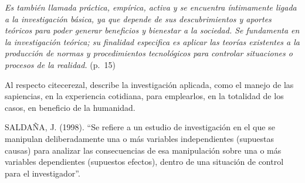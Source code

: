 \documentclass[12pt,a4paper]{article}
\begin{document}
\begin{displayquote}
\emph{Es también llamada práctica, empírica, activa y se encuentra íntimamente ligada a la investigación básica, ya que depende de sus descubrimientos y aportes teóricos para poder generar beneficios y bienestar a la sociedad. Se fundamenta en la investigación teórica; su finalidad especifica es aplicar las teorías existentes a la producción de normas y procedimientos tecnológicos para controlar situaciones  o procesos de la realidad.} (p.~15)
\end{displayquote}

Al respecto cite{cerezal}, describe la investigación aplicada, como el manejo de las sapiencias, en la experiencia cotidiana, para emplearlos, en la totalidad de los casos, en beneficio de la humanidad.

SALDAÑA, J. (1998). ``Se refiere a un estudio de investigación en
el que se manipulan deliberadamente una o más variables independientes
(supuestas causas)
para analizar las consecuencias de esa manipulación sobre una o más
variables dependientes
(supuestos efectos), dentro de una situación de control para el investigador''.



\end{document}
